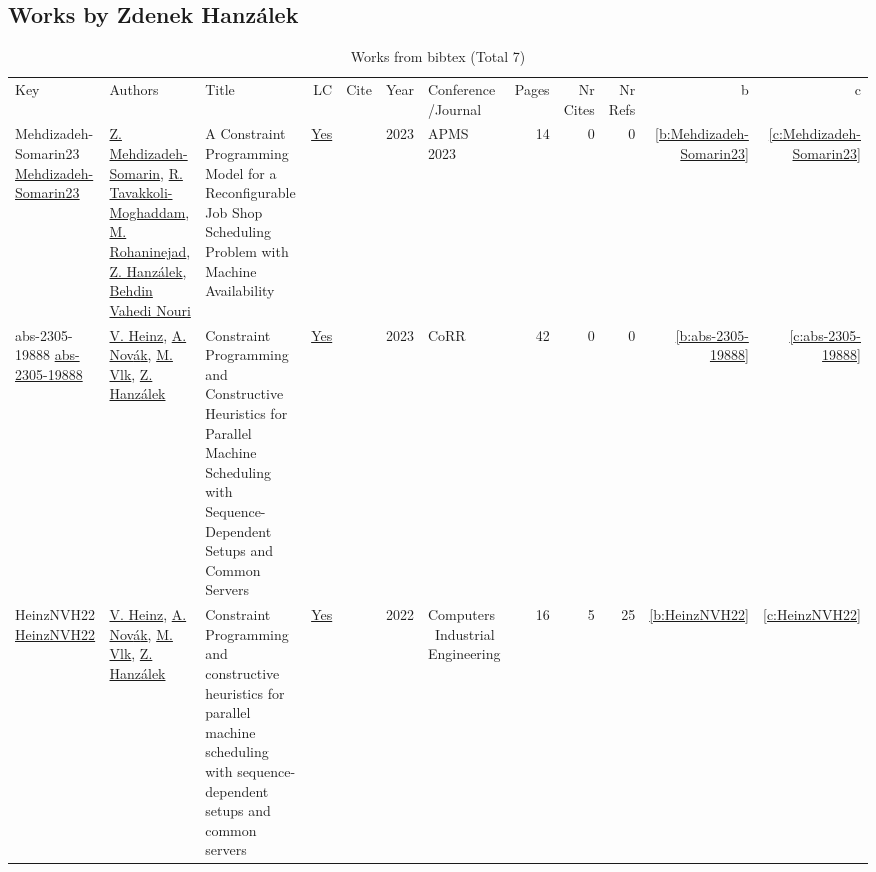 \subsection{Works by Zdenek Hanz{\'{a}}lek}
\label{sec:a116}
{\scriptsize
\begin{longtable}{>{\raggedright\arraybackslash}p{3cm}>{\raggedright\arraybackslash}p{6cm}>{\raggedright\arraybackslash}p{6.5cm}rrrp{2.5cm}rrrrr}
\rowcolor{white}\caption{Works from bibtex (Total 7)}\\ \toprule
\rowcolor{white}Key & Authors & Title & LC & Cite & Year & \shortstack{Conference\\/Journal} & Pages & \shortstack{Nr\\Cites} & \shortstack{Nr\\Refs} & b & c \\ \midrule\endhead
\bottomrule
\endfoot
Mehdizadeh-Somarin23 \href{https://doi.org/10.1007/978-3-031-43670-3\_33}{Mehdizadeh-Somarin23} & \hyperref[auth:a435]{Z. Mehdizadeh{-}Somarin}, \hyperref[auth:a436]{R. Tavakkoli{-}Moghaddam}, \hyperref[auth:a437]{M. Rohaninejad}, \hyperref[auth:a116]{Z. Hanz{\'{a}}lek}, \hyperref[auth:a438]{Behdin Vahedi Nouri} & A Constraint Programming Model for a Reconfigurable Job Shop Scheduling Problem with Machine Availability & \href{works/Mehdizadeh-Somarin23.pdf}{Yes} & \cite{Mehdizadeh-Somarin23} & 2023 & APMS 2023 & 14 & 0 & 0 & \ref{b:Mehdizadeh-Somarin23} & \ref{c:Mehdizadeh-Somarin23}\\
abs-2305-19888 \href{https://doi.org/10.48550/arXiv.2305.19888}{abs-2305-19888} & \hyperref[auth:a439]{V. Heinz}, \hyperref[auth:a440]{A. Nov{\'{a}}k}, \hyperref[auth:a314]{M. Vlk}, \hyperref[auth:a116]{Z. Hanz{\'{a}}lek} & Constraint Programming and Constructive Heuristics for Parallel Machine Scheduling with Sequence-Dependent Setups and Common Servers & \href{works/abs-2305-19888.pdf}{Yes} & \cite{abs-2305-19888} & 2023 & CoRR & 42 & 0 & 0 & \ref{b:abs-2305-19888} & \ref{c:abs-2305-19888}\\
HeinzNVH22 \href{https://doi.org/10.1016/j.cie.2022.108586}{HeinzNVH22} & \hyperref[auth:a439]{V. Heinz}, \hyperref[auth:a440]{A. Nov{\'{a}}k}, \hyperref[auth:a314]{M. Vlk}, \hyperref[auth:a116]{Z. Hanz{\'{a}}lek} & Constraint Programming and constructive heuristics for parallel machine scheduling with sequence-dependent setups and common servers & \href{works/HeinzNVH22.pdf}{Yes} & \cite{HeinzNVH22} & 2022 & Computers \  Industrial Engineering & 16 & 5 & 25 & \ref{b:HeinzNVH22} & \ref{c:HeinzNVH22}\\

\end{longtable}}
